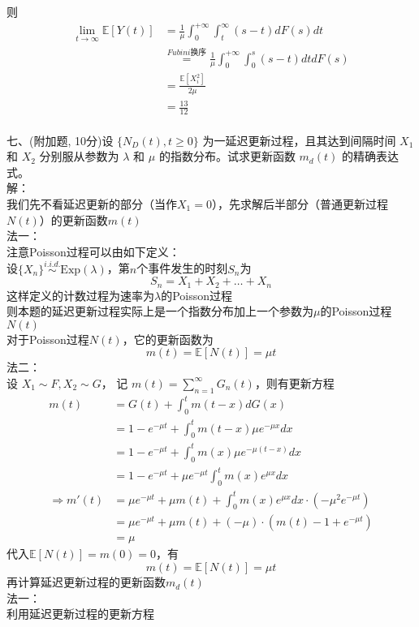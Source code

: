 \documentclass[UTF8,openany]{book}
\begin{document}
则
$$
\begin{aligned}
	\lim_{t\to \infty}\mathbb{E}[Y(t)]&=\frac{1}{\mu}\int_{0}^{+\infty} \int_{t}^{\infty}(s-t)dF(s)dt\\
	&\stackrel{Fubini\text{换序}}{=}\frac{1}{\mu}\int_{0}^{+\infty} \int_{0}^{s}(s-t)dtdF(s)\\
	&=\frac{\mathbb{E}[X_i^2]}{2\mu}\\
	&=\frac{13}{12}
\end{aligned}
$$\\



\noindent 七、(附加题, 10分)设 $\{N_D(t), t \geq 0\}$ 为一延迟更新过程，且其达到间隔时间 $X_1$ 和 $X_2$ 分别服从参数为 $\lambda$ 和 $\mu$ 的指数分布。试求更新函数 $m_d(t)$ 的精确表达式。\\
解：\\
我们先不看延迟更新的部分（当作$X_1=0$），先求解后半部分（普通更新过程$N(t)$）的更新函数$m(t)$\\
法一：\\
注意Poisson过程可以由如下定义：\\
设$\{X_n\}\stackrel{i.i.d.}{\sim} \mathrm{Exp}(\lambda)$，第$n$个事件发生的时刻$S_n$为
\[
S_n=X_1+X_2+\dots+X_n
\]
这样定义的计数过程为速率为$\lambda$的Poisson过程\\
则本题的延迟更新过程实际上是一个指数分布加上一个参数为$\mu$的Poisson过程$N(t)$\\
对于Poisson过程$N(t)$，它的更新函数为
\[
m(t)=\mathbb{E}[N(t)]=\mu t
\]
法二：\\
设 $X_1\sim F,X_2\sim G$，
记 $m(t)=\sum_{n=1}^{\infty}G_n(t)$，则有更新方程
\begin{align*}
	m(t)&=G(t) + \int_0^t m(t - x) dG(x)\\
	&=1-e^{-\mu t}+\int_0^t m(t - x)  \mu e^{-\mu x}dx\\
	&=1-e^{-\mu t}+\int_0^t m(x)  \mu e^{-\mu (t-x)}dx\\
	&=1-e^{-\mu t}+\mu e^{-\mu t}\int_0^t m(x)e^{\mu x}dx\\
	\Rightarrow m'(t)&=\mu e^{-\mu t}+\mu m(t)+\int_0^t m(x)e^{\mu x}dx\cdot(-\mu^2e^{-\mu t})\\
	&=\mu e^{-\mu t}+\mu m(t)+(-\mu)\cdot(m(t)-1+e^{-\mu t})\\
	&=\mu
\end{align*}
代入$\mathbb{E}[N(t)]=m(0)=0$，有
\[
m(t)=\mathbb{E}[N(t)]=\mu t
\]
再计算延迟更新过程的更新函数$m_d(t)$\\
法一：\\
利用延迟更新过程的更新方程
\end{document}
